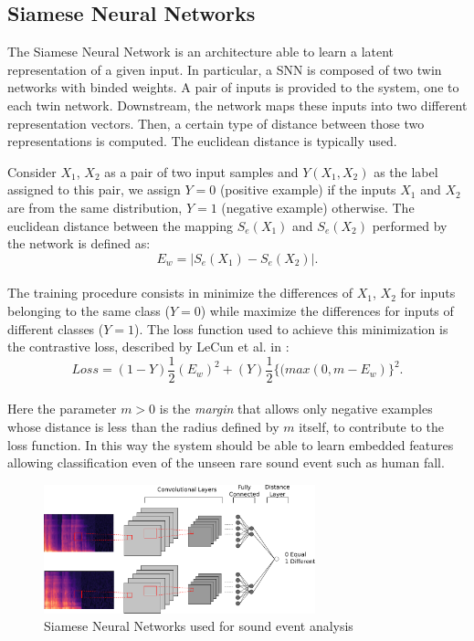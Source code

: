 \subsection{Siamese Neural Networks}

The Siamese Neural Network is an architecture able to learn a latent representation of a given input. In particular, a SNN is composed of two twin networks with binded weights. A pair of inputs is provided to the system, one to each twin network. Downstream, the network maps these inputs into two different representation vectors. Then, a certain type of distance between those two representations is computed. The euclidean distance is typically used. 

Consider $X_1$, $X_2$ as a pair of two input samples and $Y(X_1, X_2)$ as the label assigned to this pair, we assign $Y = 0$ (positive example) if the inputs $X_1$ and $X_2$ are from the same distribution, $Y = 1$ (negative example) otherwise. The euclidean distance between the mapping $S_e(X_1)$ and $S_e(X_2)$ performed by the network is defined as:
\begin{equation}
E_w = \left|{S_e (X_1) - S_e (X_2)}\right|.
\end{equation}\\
The training procedure consists in minimize the differences of $X_1$, $X_2$ for inputs belonging to the same class ($Y = 0$) while maximize the differences for inputs of different classes ($Y = 1$).
The loss function used to achieve this minimization is the contrastive loss, described by LeCun et al. in \cite{chopra2005learning}:
\begin{equation}
Loss = (1 - Y)\frac{1}{2}(E_w)^2 + (Y)\frac{1}{2}\{(max(0, m - E_w)\}^2 .
\end{equation}\\
Here the parameter $m > 0$ is the \textit{margin} that allows only negative examples whose distance is less than the radius defined by $m$ itself, to contribute to the loss function.
In this way the system should be able to learn embedded features allowing classification even of the unseen rare sound event such as human fall.

\begin{figure}[h]
	\centering
	\includegraphics[width=0.7\textwidth]{img/Siamese_approach}
	\caption[Siamese DNN]{Siamese Neural Networks used for sound event analysis}
	\label{fig:siamese}
\end{figure}



